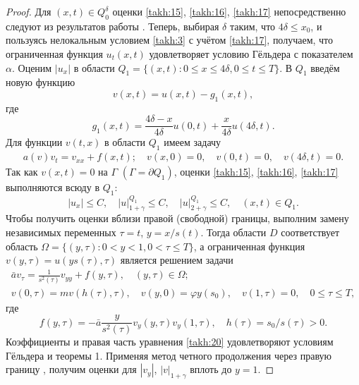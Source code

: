 \begin{proof} Для  $(x,t)\in Q^{\delta}_{0}$ оценки
\eqref{takh:15}, \eqref{takh:16}, \eqref{takh:17} непосредственно следуют из результатов работы
\cite{takh:bib:6}. Теперь, выбирая $\delta$ таким, что $4\delta\leq x_0$, и
пользуясь нелокальным условием \eqref{takh:3} с учётом \eqref{takh:17}, получаем,
что ограниченная функция $u_t(x,t)$ удовлетворяет условию Гёльдера
с показателем $\alpha$. Оценим $|u_x|$ в области
$Q_1=\{(x,t):0\leq x\leq 4\delta, 0\leq t\leq T\}$. В $Q_1$ введём
новую функцию
\begin{equation}
v(x,t)=u(x,t)-g_1(x,t), 
\label{takh:18}
\end{equation}
где
$$
g_1(x,t)=\frac{4\delta-x}{4\delta}u(0,t)+\frac{x}{4\delta}u(4\delta ,t).
$$
Для функции $v(t,x)$ в области $Q_1$ имеем задачу
\begin{gather*}
a(v)v_t=v_{xx}+f(x,t);\quad 
v(x, 0)=0, \quad  v(0,t)=0, \quad  v(4\delta ,t)=0.
\end{gather*}
Так как $v(x,t)=0$ на $\Gamma$ $(\Gamma=\partial Q_1)$,  оценки
\eqref{takh:15}, \eqref{takh:16}, \eqref{takh:17} выполняются всюду в $Q_1$:
\begin{equation}
|u_x|\leq C, \quad  |u|^{Q_1}_{1+\gamma}\leq C,  \quad |u|^{Q_1}_{2+\gamma}\leq C,\quad (x,t)\in Q_1.
\label{takh:19}
\end{equation}
Чтобы получить оценки вблизи правой (свободной) границы, выполним
замену независимых переменных $\tau =t$, $y={x}/{s(t)}$. Тогда
области $D$ соответствует область $\Omega = \{(y,\tau ): 0<y<1,
0<\tau \leq T\}$, а ограниченная функция $v(y,\tau )=u(ys(\tau),\tau )$ является решением задачи
\begin{gather}
\bar{a}v_{\tau}=\frac{1}{s^2(\tau)}v_{yy}+f(y,\tau), \quad (y,\tau)\in \Omega;\label{takh:20}
\\
v(0,\tau)=mv(h(\tau),\tau), \quad %
v(y, 0)=\varphi y(s_0),\quad  %
v(1,\tau)=0, \quad 0\leq \tau \leq T,\label{takh:23}
\end{gather}
где
$$
f(y,\tau)=-\bar{a}\frac{y}{s^2(\tau)}v_y(y,\tau)v_y(1,\tau),
\quad h(\tau)={s_0}/{s(\tau)}>0.
$$
Коэффициенты и правая часть уравнения \eqref{takh:20} удовлетворяют условиям
Гёльдера и теоремы 1. Применяя метод четного продолжения через
правую границу \cite{takh:bib:6},  получим оценки для $|v_y|$, $|v|_{1+\gamma}$
вплоть до $y=1$. \end{proof}

